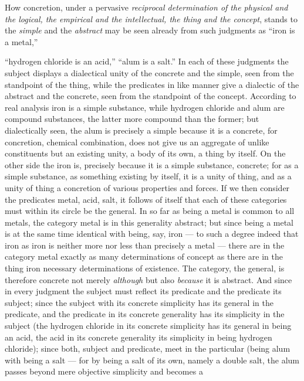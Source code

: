\documentclass[12pt,a4paper]{book}
\begin{document}
How concretion, under a pervasive \emph{reciprocal determination of the
physical and the logical, the empirical and the intellectual, the thing and the
concept}, stands to the \emph{simple} and the \emph{abstract} may be seen
already from such judgments as ``iron is a metal,''

``hydrogen chloride is an acid,'' ``alum is a salt.'' In each of these
judgments the subject displays a dialectical unity of the concrete and the
simple, seen from the standpoint of the thing, while the predicates in like
manner give a dialectic of the abstract and the concrete, seen from the
standpoint of the concept. According to real analysis iron is a simple
substance, while hydrogen chloride and alum are compound substances, the latter
more compound than the former; but dialectically seen, the alum is precisely a
simple because it is a concrete, for concretion, chemical combination, does not
give us an aggregate of unlike constituents but an existing unity, a body of
its own, a thing by itself. On the other side the iron is, precisely because it
is a simple substance, concrete; for as a simple substance, as something
existing by itself, it is a unity of thing, and as a unity of thing a
concretion of various properties and forces. If we then consider the predicates
metal, acid, salt, it follows of itself that each of these categories must
within its circle be the general. In so far as being a metal is common to all
metals, the category metal is in this generality abstract; but since being a
metal is at the same time identical with being, say, iron --- to such a degree
indeed that iron as iron is neither more nor less than precisely a metal ---
there are in the category metal exactly as many determinations of concept as
there are in the thing iron necessary determinations of existence. The
category, the general, is therefore concrete not merely \emph{although} but
also \emph{because} it is abstract. And since in every judgment the subject
must reflect its predicate and the predicate its subject; since the subject
with its concrete simplicity has its general in the predicate, and the
predicate in its concrete generality has its simplicity in the subject (the
hydrogen chloride in its concrete simplicity has its general in being an acid,
the acid in its concrete generality its simplicity in being hydrogen chloride);
since both, subject and predicate, meet in the particular (being
alum with being a salt --- for by being a salt of its own, namely a double
salt, the alum passes beyond mere objective simplicity and becomes a
\end{document}
